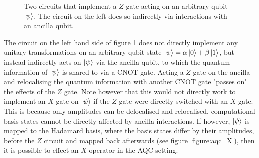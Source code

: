 \begin{figure}[h]
    \begin{center}
    \caption{Two circuits that implement a $Z$ gate acting on an arbitrary qubit $\ket{\psi}$. The circuit on the left does so indirectly via interactions with an ancilla qubit.}
    \label{figure:aqc_Z}
    \end{center}
\end{figure}
The circuit on the left hand side of figure \ref{figure:aqc_Z} does not directly implement any unitary transformations on an arbitrary qubit state $\ket{\psi} = \alpha \ket{0} + \beta \ket{1}$, but instead indirectly acts on $\ket{\psi}$ via the ancilla qubit, to which the quantum information of $\ket{\psi}$ is shared to via a CNOT gate.
Acting a $Z$ gate on the ancilla and relocalising the quantum information with another CNOT gate "passes on" the effects of the $Z$ gate.
Note however that this would not directly work to implement an $X$ gate on $\ket{\psi}$ if the $Z$ gate were directly switched with an $X$ gate.
This is because only amplitudes can be delocalised and relocalised, computational basis states cannot be directly affected by ancilla interactions.
If however, $\ket{\psi}$ is mapped to the Hadamard basis, where the basis states differ by their amplitudes, before the $Z$ circuit and mapped back afterwards (see figure \ref{figure:aqc_X}), then it is possible to effect an $X$ operator in the AQC setting.
